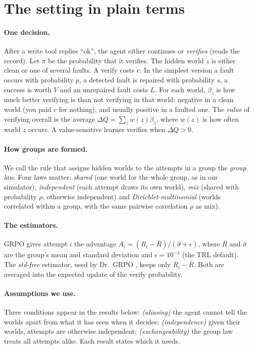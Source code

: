 \documentclass[11pt]{article}
\begin{document}
\section{The setting in plain terms}\label{sec:setup}
\paragraph{One decision.} After a write tool replies ``ok'', the agent either continues or \emph{verifies} (reads the
record). Let $\pi$ be the probability that it verifies. The hidden world $z$ is either clean or one of several faults.
A verify costs $c$. In the simplest version a fault occurs with probability $p$, a detected fault is repaired with
probability $s$, a success is worth $V$ and an unrepaired fault costs $L$. For each world, $\beta_z$ is how much
better verifying is than not verifying in that world: negative in a clean world (you paid $c$ for nothing), and
usually positive in a faulted one. The \emph{value} of verifying overall is the average
$\Delta Q=\sum_z w(z)\beta_z$, where $w(z)$ is how often world $z$ occurs. A value-sensitive learner verifies when
$\Delta Q>0$.

\paragraph{How groups are formed.} We call the rule that assigns hidden worlds to the attempts in a group the
\emph{group law}. Four laws matter: \emph{shared} (one world for the whole group, as in our simulator),
\emph{independent} (each attempt draws its own world), \emph{mix} (shared with probability $\rho$, otherwise
independent) and \emph{Dirichlet-multinomial} (worlds correlated within a group, with the same pairwise correlation
$\rho$ as mix).

\paragraph{The estimators.} GRPO gives attempt $i$ the advantage $A_i=(R_i-\bar R)/(\hat\sigma+\epsilon)$, where
$\bar R$ and $\hat\sigma$ are the group's mean and standard deviation and $\epsilon=10^{-4}$ (the TRL default). The
\emph{std-free} estimator, used by Dr.~GRPO \citep{liu2025drgrpo}, keeps only $R_i-\bar R$. Both are averaged into the
expected update of the verify probability.

\paragraph{Assumptions we use.} Three conditions appear in the results below: \emph{(aliasing)} the agent cannot tell
the worlds apart from what it has seen when it decides; \emph{(independence)} given their worlds, attempts are
otherwise independent; \emph{(exchangeability)} the group law treats all attempts alike. Each result states which it
needs.
\end{document}
